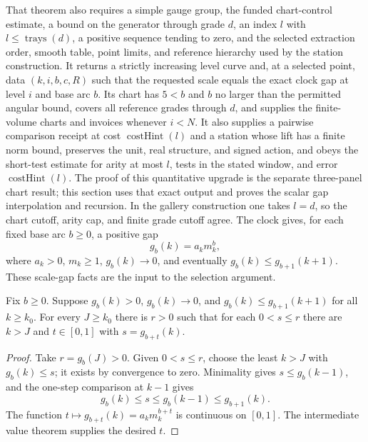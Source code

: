 That theorem also requires a simple gauge group, the funded chart-control
estimate, a bound on the generator through grade $d$, an index $l$ with
$l\leq\operatorname{trays}(d)$, a positive sequence tending to zero, and
the selected extraction order, smooth table, point limits, and reference
hierarchy used by the station construction.
It returns a strictly increasing level curve and, at a selected point,
data $(k,i,b,c,R)$ such that the requested scale equals the exact clock
gap at level $i$ and base arc $b$. Its chart has $5<b$ and $b$ no larger
than the permitted angular bound, covers all reference grades through
$d$, and supplies the finite-volume charts and invoices whenever $i<N$.
It also supplies a pairwise comparison receipt at cost
$\operatorname{costHint}(l)$ and a station whose lift has a finite norm
bound, preserves the unit, real structure, and signed action, and obeys
the short-test estimate for arity at most $l$, tests in the stated window,
and error $\operatorname{costHint}(l)$. The proof of this quantitative
upgrade is the separate three-panel chart result; this section uses that
exact output and proves the scalar gap interpolation and recursion. In
the gallery construction one takes $l=d$, so the chart cutoff, arity cap,
and finite grade cutoff agree. The clock gives, for each fixed base arc
$b\geq0$, a positive gap
\begin{equation}\label{eq:ex-lattice-firesky-gap}
 g_b(k)=a_k m_k^b,
\end{equation}
where $a_k>0$, $m_k\geq1$, $g_b(k)\to0$, and eventually
$g_b(k)\leq g_{b+1}(k+1)$. These scale-gap facts are the input to the
selection argument.

\begin{lemma}
\label{lem:ex-lattice-firesky-gap-interpolation}
Fix $b\geq0$. Suppose $g_b(k)>0$, $g_b(k)\to0$, and
$g_b(k)\leq g_{b+1}(k+1)$ for all $k\geq k_0$. For every $J\geq k_0$
there is $r>0$ such that for each $0<s\leq r$ there are $k>J$ and
$t\in[0,1]$ with $s=g_{b+t}(k)$.
\end{lemma}
\begin{proof}
Take $r=g_b(J)>0$. Given $0<s\leq r$, choose the least $k>J$ with
$g_b(k)\leq s$; it exists by convergence to zero. Minimality gives
$s\leq g_b(k-1)$, and the one-step comparison at $k-1$ gives
\[
 g_b(k)\leq s\leq g_b(k-1)\leq g_{b+1}(k).
\]
The function $t\mapsto g_{b+t}(k)=a_km_k^{b+t}$ is continuous on
$[0,1]$. The intermediate value theorem supplies the desired $t$.
\end{proof}

